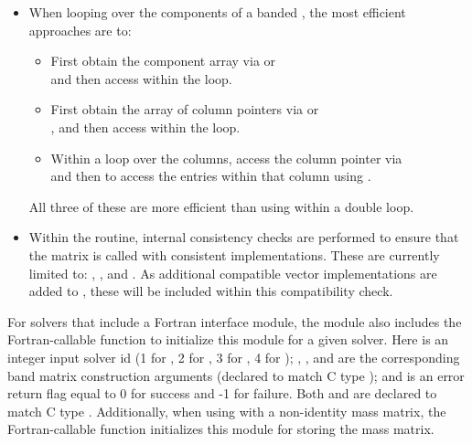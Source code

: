 \begin{itemize}

\item
  When looping over the components of a banded  ,
  the most efficient approaches are to:
  \begin{itemize}
    \item First obtain the component array via  or\\
     and then
    access  within the loop.

    \item First obtain the array of column pointers via  or\\
    , and then
    access  within the loop.

    \item Within a loop over the columns, access the column pointer via\\
     and then to access the
    entries within that column using .
  \end{itemize}
  All three of these are more efficient than
  using  within a double loop.

\item
  {\warn} Within the  routine, internal
  consistency checks are performed to ensure that the matrix is called
  with consistent {\nvector} implementations.  These are currently
  limited to: {\nvecs}, {\nvecopenmp}, and {\nvecpthreads}.  As additional
  compatible vector implementations are added to {\sundials}, these
  will be included within this compatibility check.

\end{itemize}

For solvers that include a Fortran interface module, the {\sunmatband}
module also includes the Fortran-callable
function  to initialize
this {\sunmatband} module for a given {\sundials} solver.
Here  is an integer input solver id (1 for {\cvode}, 2 for {\ida}, 3
for {\kinsol}, 4 for {\arkode}); , , and 
are the corresponding band matrix construction arguments (declared
to match C type ); and  is an error return flag
equal to 0 for success and -1 for failure. Both  and 
are declared to match C type . Additionally, when using
{\arkode} with a non-identity mass matrix, the Fortran-callable
function  initializes
this {\sunmatband} module for storing the mass matrix.
